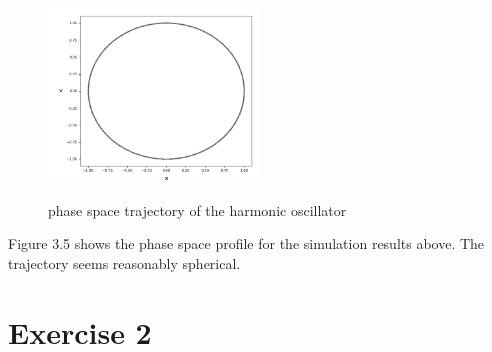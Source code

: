 \documentclass[12pt,a4paper]{article}	%
\begin{document}
\newpage

\begin{figure}[h!]		
\centering
{\includegraphics[width=0.5\textwidth]{1bphasespace.png}}		
\caption{phase space trajectory of the harmonic oscillator}
\end{figure}

Figure 3.5 shows the phase space profile for the simulation results above. The trajectory seems reasonably spherical. 

\newpage

\section{Exercise 2}







%
\end{document}
